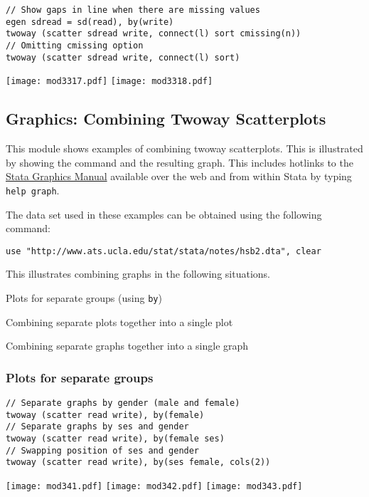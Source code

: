 \begin{lstlisting}
// Show gaps in line when there are missing values
egen sdread = sd(read), by(write)
twoway (scatter sdread write, connect(l) sort cmissing(n))
// Omitting cmissing option
twoway (scatter sdread write, connect(l) sort)
\end{lstlisting}
\begin{center}
\texttt{[image: mod3317.pdf]}
\texttt{[image: mod3318.pdf]}
\end{center}

\subsection{Graphics: Combining Twoway Scatterplots}

This module shows examples of combining twoway scatterplots.  This is illustrated by showing the command and the resulting graph.  This includes hotlinks to the \href{http://www.stata.com/help.cgi?graph}{Stata Graphics Manual} available over the web and from within Stata by typing \lstinline{help graph}.

The data set used in these examples can be obtained using the following command:
\begin{lstlisting}
use "http://www.ats.ucla.edu/stat/stata/notes/hsb2.dta", clear
\end{lstlisting}

This illustrates combining graphs in the following situations.
\begin{compactitem}
\item Plots for separate groups (using \lstinline{by})
\item Combining separate plots together into a single plot
\item Combining separate graphs together into a single graph
\end{compactitem}

\subsubsection{Plots for separate groups}

\begin{lstlisting}
// Separate graphs by gender (male and female)
twoway (scatter read write), by(female)
// Separate graphs by ses and gender
twoway (scatter read write), by(female ses)
// Swapping position of ses and gender
twoway (scatter read write), by(ses female, cols(2))
\end{lstlisting}
\begin{center}
\texttt{[image: mod341.pdf]}
\texttt{[image: mod342.pdf]}
\texttt{[image: mod343.pdf]}
\end{center}

